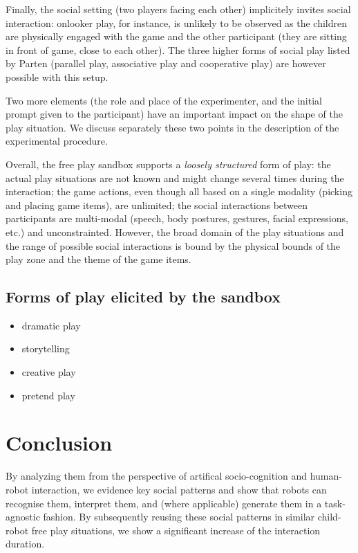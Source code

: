 \documentclass{article}
\begin{document}
Finally, the social setting (two players facing each other) implicitely invites
social interaction: onlooker play, for instance, is unlikely to be observed as
the children are physically engaged with the game and the other participant
(they are sitting in front of game, close to each other). The three higher forms
of social play listed by Parten (parallel play, associative play and cooperative
play) are however possible with this setup.


Two more elements (the role and place of the experimenter, and the initial
prompt given to the participant) have an important impact on the shape of the
play situation. We discuss separately these two points in the description of the
experimental procedure.

Overall, the free play sandbox supports a \emph{loosely structured} form of play: the
actual play situations are not known and might change several times during the
interaction; the game actions, even though all based on a single modality (picking and
placing game items), are unlimited; the social interactions between participants
are multi-modal (speech, body postures, gestures, facial expressions, etc.) and
unconstrainted. However, the broad domain of the play situations and the range of
possible social interactions is bound by the physical bounds of the play zone
and the theme of the game items.

\subsection{Forms of play elicited by the sandbox}

\begin{itemize}
    \item dramatic play
    \item storytelling
    \item creative play
    \item pretend play
\end{itemize}

\section{Conclusion}


By analyzing them from the
perspective of artifical socio-cognition and human-robot interaction, we
evidence key social patterns and show that robots can recognise them,
interpret them, and (where applicable) generate them in a task-agnostic
fashion. By subsequently reusing these social patterns in similar
child-robot free play situations, we show a significant increase of the
interaction duration.




\end{document}
